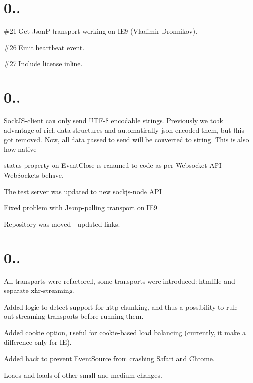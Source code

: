 \section*{0.. }


\begin{DoxyItemize}
\item \#21 Get JsonP transport working on I\+E9 (Vladimir Dronnikov).
\item \#26 Emit heartbeat event.
\item \#27 Include license inline.
\end{DoxyItemize}

\section*{0.. }


\begin{DoxyItemize}
\item Sock\+J\+S-\/client can only send U\+T\+F-\/8 encodable strings. Previously we took advantage of rich data structures and automatically json-\/encoded them, but this got removed. Now, all data passed to {\ttfamily send} will be converted to string. This is also how native
\item {\ttfamily status} property on {\ttfamily Event\+Close} is renamed to {\ttfamily code} as per Websocket A\+PI Web\+Sockets behave.
\item The test server was updated to new {\ttfamily sockjs-\/node} A\+PI
\item Fixed problem with Jsonp-\/polling transport on I\+E9
\item Repository was moved -\/ updated links.
\end{DoxyItemize}

\section*{0.. }


\begin{DoxyItemize}
\item All transports were refactored, some transports were introduced\+: htmlfile and separate xhr-\/streaming.
\item Added logic to detect support for http chunking, and thus a possibility to rule out streaming transports before running them.
\item Added \textquotesingle{}cookie\textquotesingle{} option, useful for cookie-\/based load balancing (currently, it make a difference only for IE).
\item Added hack to prevent Event\+Source from crashing Safari and Chrome.
\item Loads and loads of other small and medium changes.
\end{DoxyItemize}

